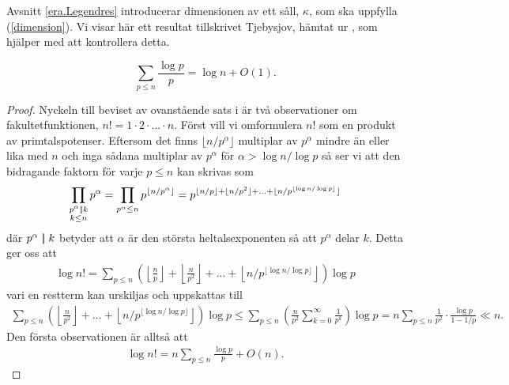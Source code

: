 
Avsnitt \ref{era.Legendres} introducerar dimensionen av ett såll, \(\kappa\), som ska uppfylla (\ref{dimension}). Vi visar här ett resultat tillskrivet Tjebysjov, hämtat ur \cite[Sats 1.4.3]{cojocarumurty}, som hjälper med att kontrollera detta.
\begin{theorem} \label{APDX:THM1.4.3}
    \[\sum_{p \leq n} \frac{\log p}{p} = \log n + O(1). \]
\end{theorem}
\begin{proof}
Nyckeln till beviset av ovanstående sats i \cite{cojocarumurty} är två observationer om fakultetfunktionen, \(n! = 1 \cdot 2 \cdot ... \cdot n\). Först vill vi omformulera \(n!\) som en produkt av primtalspotenser. Eftersom det finns \(\lfloor n / p^\alpha \rfloor\) multiplar av \(p^\alpha\) mindre än eller lika med $n$ och inga sådana multiplar av \(p^\alpha\) för \(\alpha > \log n / \log p\) så ser vi att den bidragande faktorn för varje $p \leq n$ kan skrivas som 
\begin{align*}
    \prod_{\substack{p^\alpha \mid\!\mid k \\ k \leq n}} p^\alpha = \prod_{p^\alpha \leq n} p^{\lfloor n/p^{\alpha} \rfloor} = p^{\lfloor n/p \rfloor + \lfloor n/p^2 \rfloor + ... + \lfloor n / p^{\lfloor \log n / \log p \rfloor} \rfloor}
\end{align*}
där \(p^\alpha \mid\!\mid k\) betyder att \(\alpha\) är den största heltalsexponenten så att $p^\alpha$ delar $k$. Detta ger oss att 
\begin{align*}
    \log n! = %
    \sum_{p \leq n} \left(\left\lfloor\frac{n}{p} \right\rfloor + \left\lfloor \frac{n}{p^2} \right\rfloor + ... + \left\lfloor n / p^{\lfloor \log n / \log p \rfloor} \right\rfloor\right) \log p
\end{align*}
vari en restterm kan urskiljas och uppskattas till
\begin{align*}
    \sum_{p \leq n} \left(\left\lfloor \frac{n}{p^2} \right\rfloor + ... + \left\lfloor n / p^{\lfloor \log n / \log p \rfloor} \right\rfloor\right) \log p \leq
    \sum_{p \leq n} \left( \frac{n}{p^2}  \sum_{k=0}^\infty \frac{1}{p^k} \right) \log p
    = n \sum_{p \leq n} \frac{1}{p^2} \cdot \frac{\log p}{1 - 1/p} \ll n.
\end{align*} %
Den första observationen är alltså att
\begin{align} \label{APDX:obser1Thm1.4.3}
    \log n! = n \sum_{p \leq n} \frac{\log p}{p} + O(n).
\end{align}


\end{proof}

